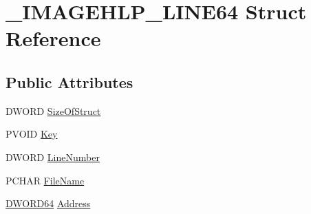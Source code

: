 \hypertarget{struct___i_m_a_g_e_h_l_p___l_i_n_e64}{\section{\-\_\-\-I\-M\-A\-G\-E\-H\-L\-P\-\_\-\-L\-I\-N\-E64 Struct Reference}
\label{struct___i_m_a_g_e_h_l_p___l_i_n_e64}
}
\subsection*{Public Attributes}
\begin{DoxyCompactItemize}
\item 
D\-W\-O\-R\-D \hyperlink{struct___i_m_a_g_e_h_l_p___l_i_n_e64_add67362ebbf03475b285efcb2573d0ef}{Size\-Of\-Struct}
\item 
P\-V\-O\-I\-D \hyperlink{struct___i_m_a_g_e_h_l_p___l_i_n_e64_af7ebc5313c21bb8ec404025137c8543e}{Key}
\item 
D\-W\-O\-R\-D \hyperlink{struct___i_m_a_g_e_h_l_p___l_i_n_e64_ad382f0cffcbbeadef43b548121ef3000}{Line\-Number}
\item 
P\-C\-H\-A\-R \hyperlink{struct___i_m_a_g_e_h_l_p___l_i_n_e64_a8a429f2428ba376b987da9d9fac583a8}{File\-Name}
\item 
\hyperlink{_stack_walker_8h_a97fb241c597b99bcb965858f53cacac4}{D\-W\-O\-R\-D64} \hyperlink{struct___i_m_a_g_e_h_l_p___l_i_n_e64_a314ba60c59baa569b187137141864a6f}{Address}
\end{DoxyCompactItemize}


